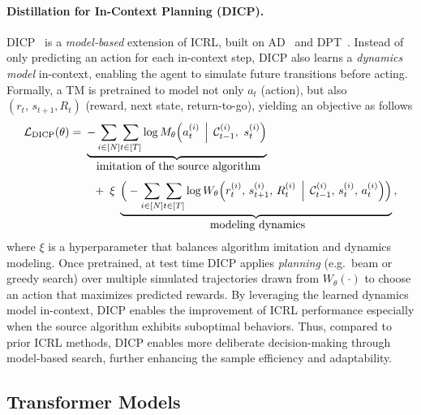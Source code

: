 \documentclass{article}
\newcommand{\gL}{\mathcal{L}}
\begin{document}
\paragraph{Distillation for In-Context Planning (DICP).}  
%
DICP~\citep{son2025distilling} is a \emph{model-based} extension of ICRL, built on AD~\citep{laskin2022context} and DPT~\citep{lee2024supervised}. 
Instead of only predicting an action for each in-context step, DICP also learns a \emph{dynamics model} in-context, enabling the agent to simulate future transitions before acting.
Formally, a TM is pretrained to model not only $a_t$ (action), but also $(r_t,\,s_{t+1}, R_t)$ (reward, next state, return-to-go), yielding an objective as follows
\begin{equation}
\label{eq:dicp}
\begin{aligned}
\gL_{\mathrm{DICP}}(\theta)
= &~
\underbrace{
- \sum_{i \in [N]}\!
  \sum_{t \in [T]}
  \log 
  M_{\theta}\Bigl(
    a_{t}^{(i)}
    \,\Bigm|\,
    \ccalC_{t-1}^{(i)},\
    s_{t}^{(i)}
  \Bigr)
}_{\text{\normalsize imitation of the source algorithm}}
\\[0.3em]
& \quad
+ \;
\xi \;
\underbrace{
  \Big(- \sum_{i \in [N]}\!
  \sum_{t \in [T]}
  \log 
  W_{\theta}\Bigl(
    r_{t}^{(i)},\,s_{t+1}^{(i)},\, R_t^{(i)}
    \,\Bigm|\,\ccalC_{t-1}^{(i)},\,s_{t}^{(i)}, \,
    a_{t}^{(i)}
  \Bigr)\Big)
}_{\text{\normalsize modeling dynamics}}
\,,
\end{aligned}
\end{equation}
%
where \(\xi\) is a hyperparameter that balances algorithm imitation and dynamics modeling.
Once pretrained, at test time DICP applies \emph{planning} (e.g.\ beam or greedy search) over multiple simulated trajectories drawn from $W_{\theta}(\cdot)$ to choose an action that maximizes predicted rewards. By leveraging the learned dynamics model in-context, DICP enables the improvement of ICRL performance especially when the source algorithm exhibits suboptimal behaviors. Thus, compared to prior ICRL methods, DICP enables more deliberate decision-making through model-based search, further enhancing the sample efficiency and adaptability.



\subsection{Transformer Models}
\label{append_transformer_hyperparameter}
\end{document}

